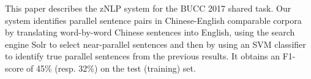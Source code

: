This paper describes the zNLP system for the BUCC 2017 shared task. Our system identifies parallel sentence pairs in Chinese-English comparable corpora by translating word-by-word Chinese sentences into English, using the search engine Solr to select near-parallel sentences and then by using an SVM classifier to identify true parallel sentences from the previous results. It obtains an F1-score of 45\% (resp. 32\%) on the test (training) set.

